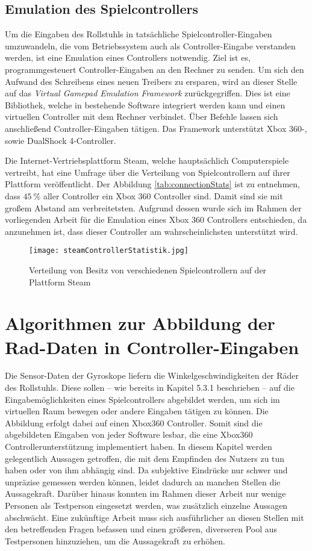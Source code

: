 \subsection{Emulation des Spielcontrollers}
Um die Eingaben des Rollstuhls in tatsächliche Spielcontroller-Eingaben umzuwandeln, die vom Betriebssystem auch als Controller-Eingabe verstanden werden, ist eine Emulation eines Controllers notwendig.
Ziel ist es, programmgesteuert Controller-Eingaben an den Rechner zu senden.
Um sich den Aufwand des Schreibens eines neuen Treibers zu ersparen, wird an dieser Stelle auf das \textit{Virtual Gamepad Emulation Framework}\cite{VirtualGamepadEmulation} zurückgegriffen.
Dies ist eine Bibliothek, welche in bestehende Software integriert werden kann und einen virtuellen Controller mit dem Rechner verbindet.
Über Befehle lassen sich anschließend Controller-Eingaben tätigen.
Das Framework unterstützt Xbox 360-, sowie DualShock 4-Controller\cite{VirtualGamepadEmulationa}.

Die Internet-Vertriebsplattform Steam, welche hauptsächlich Computerspiele vertreibt, hat eine Umfrage über die Verteilung von Spielcontrollern auf ihrer Plattform veröffentlicht.
Der Abbildung \ref{tab:connectionStats} ist zu entnehmen, dass $45\ \%$ aller Controller ein Xbox 360 Controller sind\cite{SteamSteamNews2018}.
Damit sind sie mit großem Abstand am verbreitetsten.
Aufgrund dessen wurde sich im Rahmen der vorliegenden Arbeit für die Emulation eines Xbox 360 Controllers entschieden, da anzunehmen ist, dass dieser Controller am wahrscheinlichsten unterstützt wird.

\begin{figure}[h]
    \centering
    \texttt{[image: steamControllerStatistik.jpg]}
    \caption{Verteilung von Besitz von verschiedenen Spielcontrollern auf der Plattform Steam\cite{SteamSteamNews2018}}
    \label{fig:controllerStats}
\end{figure}

\section{Algorithmen zur Abbildung der Rad-Daten in Controller-Eingaben}
Die Sensor-Daten der Gyroskope liefern die Winkelgeschwindigkeiten der Räder des Rollstuhls.
Diese sollen – wie bereits in Kapitel 5.3.1 beschrieben – auf die Eingabemöglichkeiten eines Spielcontrollers abgebildet werden, um sich im virtuellen Raum bewegen oder andere Eingaben tätigen zu können.
Die Abbildung erfolgt dabei auf einen Xbox360 Controller.
Somit sind die abgebildeten Eingaben von jeder Software lesbar, die eine Xbox360 Controllerunterstützung implementiert haben.
In diesem Kapitel werden gelegentlich Aussagen getroffen, die mit dem Empfinden des Nutzers zu tun haben oder von ihm abhängig sind.
Da subjektive Eindrücke nur schwer und unpräzise gemessen werden können, leidet dadurch an manchen Stellen die Aussagekraft.
Darüber hinaus konnten im Rahmen dieser Arbeit nur wenige Personen als Testperson eingesetzt werden, was zusätzlich einzelne Aussagen abschwächt.
Eine zukünftige Arbeit muss sich ausführlicher an diesen Stellen mit den betreffenden Fragen befassen und einen größeren, diverseren Pool aus Testpersonen hinzuziehen, um die Aussagekraft zu erhöhen.

